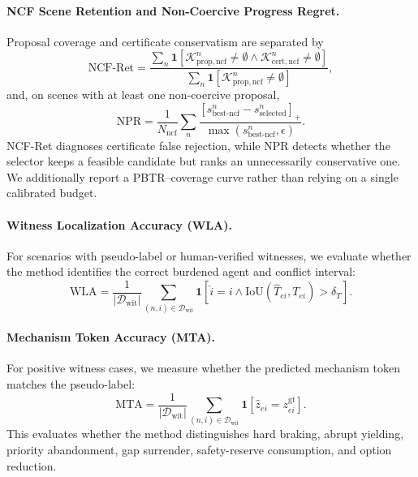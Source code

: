 \documentclass[10pt]{article}
\begin{document}
\paragraph{NCF Scene Retention and Non-Coercive Progress Regret.}
Proposal coverage and certificate conservatism are separated by
\begin{equation}
    \mathrm{NCF\mbox{-}Ret}
    =
    \frac{
      \sum_n \mathbf 1[\mathcal K^n_{\mathrm{prop,ncf}}\neq\emptyset
      \wedge \mathcal K^n_{\mathrm{cert,ncf}}\neq\emptyset]
    }{
      \sum_n \mathbf 1[\mathcal K^n_{\mathrm{prop,ncf}}\neq\emptyset]
    },
\end{equation}
and, on scenes with at least one non-coercive proposal,
\begin{equation}
    \mathrm{NPR}
    =
    \frac{1}{N_{\mathrm{ncf}}}
    \sum_n
    \frac{[s^{n}_{\mathrm{best\mbox{-}ncf}}-s^{n}_{\mathrm{selected}}]_+}
         {\max(s^{n}_{\mathrm{best\mbox{-}ncf}},\epsilon)}.
\end{equation}
NCF-Ret diagnoses certificate false rejection, while NPR detects whether the selector keeps a feasible candidate but ranks an unnecessarily conservative one. We additionally report a PBTR--coverage curve rather than relying on a single calibrated budget.

\paragraph{Witness Localization Accuracy (WLA).}
For scenarios with pseudo-label or human-verified witnesses, we evaluate whether the method identifies the correct burdened agent and conflict interval:
\begin{equation}
    \mathrm{WLA}
    =
    \frac{1}{|\mathcal{D}_{\mathrm{wit}}|}
    \sum_{(n,i)\in\mathcal{D}_{\mathrm{wit}}}
    \mathbf{1}
    [
    \widehat{i}=i
    \wedge
    \mathrm{IoU}(\widehat{T}_{ei},T_{ei})>\delta_T
    ].
\end{equation}

\paragraph{Mechanism Token Accuracy (MTA).}
For positive witness cases, we measure whether the predicted mechanism token matches the pseudo-label:
\begin{equation}
    \mathrm{MTA}
    =
    \frac{1}{|\mathcal{D}_{\mathrm{wit}}|}
    \sum_{(n,i)\in\mathcal{D}_{\mathrm{wit}}}
    \mathbf{1}
    [
    \widehat{z}_{ei}=z^{\mathrm{gt}}_{ei}
    ].
\end{equation}
This evaluates whether the method distinguishes hard braking, abrupt yielding, priority abandonment, gap surrender, safety-reserve consumption, and option reduction.
\end{document}
